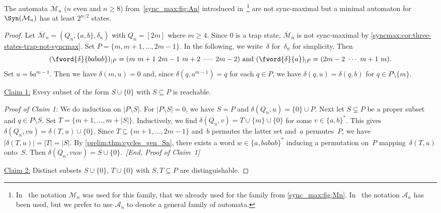 \begin{theorem}
\label{syn_max:thm:An}
  The automata $\overline{\mathcal{M}}_n$ ($n$ even and $n \ge 8$) from~\cref{sync_max:fig:An} introduced in~\cite{Martugin08}\footnote{In~\cite{DBLP:journals/jalc/AnanichevV19} the notation
  	$\mathcal M_n$ was used for this family, that we already used
  	for the family from \cref{sync_max:fig:Mn}.
  	In~\cite{Martugin08} 
  	the notation $\mathcal A_n$ has been used, but we prefer to use
  	$\mathcal A_n$ to denote a general family of automata.}  	  
  are not sync-maximal
  but a minimal automaton for $\Syn(\mathcal{M}_n)$ has at least $2^{n/2}$ states.
\end{theorem}
\begin{proof}
	Let $\overline{\mathcal{M}}_n = (Q_n,\{a,b\},\delta_n)$
	with $Q_n = [2m]$ where $m \ge 4$.	
	Since $0$ is a trap state, $\overline{\mathcal{M}}_n$ is not sync-maximal by \cref{syncmax:cor:three-states-trap-not-syncmax}.
	Set $P = \{ m, m +1, \ldots, 2m-1 \}$.
	In the following, we write~$\delta$ 
	for~$\delta_n$ for simplicity.
	Then
	\[
	( \fword{\delta}{babab} )_{| P } = (m ~ m + 1 ~ 2m-1 ~ m+2 ~ \cdots ~ 2m-2) \text{ and }
	( \fword{\delta}{a} )_{| P } = (2m - 2 ~ \cdots ~ m+1 ~ m).
	\]
	Set $u = ba^{m-1}$.
	Then we have $\delta(m, u) = 0$
	and, since $\delta(q, a^{m-1}) = q$
	for each $q \in P$,
	we have $\delta(q, u) = \delta(q, b)$
	for $q \in P \setminus \{m\}$.	
	
	\medskip 
	\noindent\underline{Claim 1:} Every subset of the form $S \cup \{0\}$
	with $S \subseteq P$
	is reachable.
	
	\medskip	
	\noindent\emph{Proof of Claim 1:} We do induction on $|P \setminus S|$.
	For $|P \setminus S| = 0$, we have $S = P$ and 
	$\delta(Q_n, u) = \{0\} \cup P$.	
	Next let $S \subsetneq P$
	be a proper subset and $q \in P \setminus S$.
    Set $T = \{m+1,\ldots,m+|S|\}$.
	Inductively, 
	we find $\delta(Q_n, v) = T \cup \{m\} \cup \{0\}$
	for some $v \in \{a,b\}^*$.
	This gives $\delta(Q_n, vu) = \delta(T, u) \cup \{0\}$.
	Since $T \subseteq \{m+1, \ldots, 2m-1\}$
	and~$b$ permutes the latter set
	and~$a$ permutes~$P$,
	we have $|\delta(T, u)| = |T| = |S|$.	
	By \cref{prelim:thm:cycles_gen_Sn},  
	there exists a word $w \in \{a,babab\}^*$
	inducing a permutation on~$P$
	mapping~$\delta(T, u)$
	onto~$S$. Then $\delta(Q_n, vuw) = S \cup \{0\}$.~\emph{[End, Proof of Claim~1]}
	
	\medskip 
	\noindent\underline{Claim 2:} Distinct subsets $S \cup \{0\}$, $T \cup \{0\}$
	with $S, T \subseteq P$ are distinguishable.
	

\end{proof}
